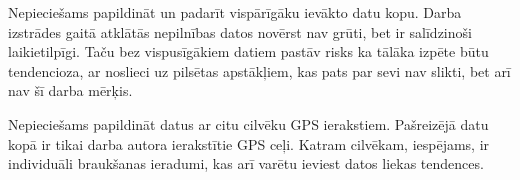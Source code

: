 \documentclass{ludis}
\begin{document}
Nepieciešams papildināt un padarīt vispārīgāku ievākto datu kopu. Darba izstrādes gaitā atklātās
nepilnības datos novērst nav grūti, bet ir salīdzinoši laikietilpīgi. Taču bez vispusīgākiem
datiem pastāv risks ka tālāka izpēte būtu tendencioza, ar noslieci uz pilsētas apstākļiem, kas
pats par sevi nav slikti, bet arī nav šī darba mērķis.

Nepieciešams papildināt datus ar citu cilvēku GPS ierakstiem. Pašreizējā datu kopā ir tikai darba
autora ierakstītie GPS ceļi. Katram cilvēkam, iespējams, ir individuāli braukšanas ieradumi, kas
arī varētu ieviest datos liekas tendences.

\end{document}
